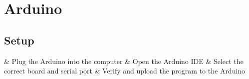 %
%
%

\section{Arduino}
	\label{sec:arduino}
\subsection{Setup}
	\label{subsec:arduino:setup}
\begin{easylist}

	& Plug the Arduino into the computer
	& Open the Arduino IDE
	& Select the correct board and serial port
	& Verify and upload the program to the Arduino

\end{easylist}
